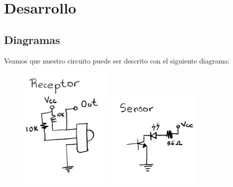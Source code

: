 \documentclass[12pt, fleqn]{article}                            %
\theoremstyle{break}                                            %
\begin{document}
\clearpage
\section{Desarrollo}


    \subsection{Diagramas}

        Veamos que nuestro circuito puede ser descrito con el siguiente diagrama:
        \begin{figure}[h]
            \centering
            \includegraphics[width=0.4\textwidth]{Diagram0}
            \includegraphics[width=0.4\textwidth]{Diagram1}
        \end{figure}
\end{document}

